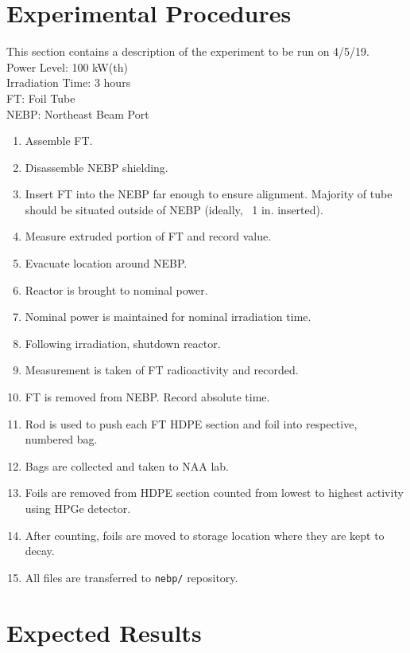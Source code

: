 \documentclass{amsart}
\theoremstyle{definition}
\begin{document}
\clearpage

\section{Experimental Procedures}
\bigskip

\noindent
This section contains a description of the experiment to be run on 4/5/19. \\
Power Level: 100 kW(th) \\
Irradiation Time: 3 hours \\
FT: Foil Tube \\
NEBP: Northeast Beam Port \\


\begin{enumerate}
\item Assemble FT.
\item Disassemble NEBP shielding.
\item Insert FT into the NEBP far enough to ensure alignment. Majority of tube should be situated outside of NEBP (ideally, ~1 in. inserted).
\item Measure extruded portion of FT and record value.
\item Evacuate location around NEBP.
\item Reactor is brought to nominal power.
\item Nominal power is maintained for nominal irradiation time.
\item Following irradiation, shutdown reactor.
\item Measurement is taken of FT radioactivity and recorded.
\item FT is removed from NEBP. Record absolute time.
\item Rod is used to push each FT HDPE section and foil into respective, numbered bag.
\item Bags are collected and taken to NAA lab.
\item Foils are removed from HDPE section counted from lowest to highest activity using HPGe detector.
\item After counting, foils are moved to storage location where they are kept to decay.
\item All files are transferred to {\tt nebp/} repository.
\end{enumerate}


\newpage
\section{Expected Results}
\bigskip
\end{document}
